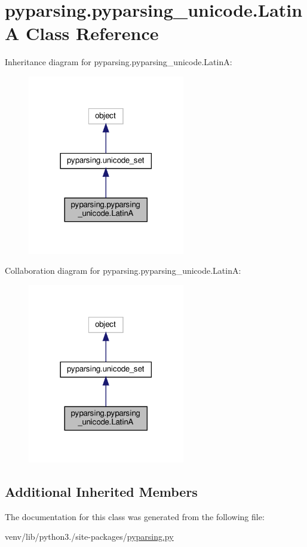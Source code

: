 \hypertarget{classpyparsing_1_1pyparsing__unicode_1_1LatinA}{}\section{pyparsing.\+pyparsing\+\_\+unicode.\+LatinA Class Reference}
\label{classpyparsing_1_1pyparsing__unicode_1_1LatinA}


Inheritance diagram for pyparsing.\+pyparsing\+\_\+unicode.\+LatinA\+:
\nopagebreak
\begin{figure}[H]
\begin{center}
\leavevmode
\includegraphics[width=194pt]{classpyparsing_1_1pyparsing__unicode_1_1LatinA__inherit__graph}
\end{center}
\end{figure}


Collaboration diagram for pyparsing.\+pyparsing\+\_\+unicode.\+LatinA\+:
\nopagebreak
\begin{figure}[H]
\begin{center}
\leavevmode
\includegraphics[width=194pt]{classpyparsing_1_1pyparsing__unicode_1_1LatinA__coll__graph}
\end{center}
\end{figure}
\subsection*{Additional Inherited Members}


The documentation for this class was generated from the following file\+:\begin{DoxyCompactItemize}
\item 
venv/lib/python3./site-\/packages/\hyperlink{pyparsing_8py}{pyparsing.\+py}\end{DoxyCompactItemize}
